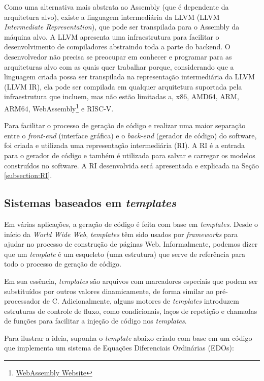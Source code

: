 \documentclass[
	12pt,				%
	openright,			%
	oneside,			%
	a4paper,			%
	main=brazil,
	english,			%
	]{ufsj-abntex2}
\begin{document}
Como uma alternativa mais abstrata ao Assembly (que é dependente da arquitetura alvo), existe a linguagem intermediária da LLVM (LLVM \textit{Intermediate Representation}), que pode ser transpilada para o Assembly da máquina alvo. A LLVM apresenta uma infraestrutura para facilitar o desenvolvimento de compiladores abstraindo toda a parte do backend. O desenvolvedor não precisa se preocupar em conhecer e programar para as arquiteturas alvo com as quais quer trabalhar porque, considerando que a linguagem criada possa ser transpilada na representação intermediária da LLVM (LLVM IR), ela pode ser compilada em qualquer arquitetura suportada pela infraestrutura que incluem, mas não estão limitadas a, x86, AMD64, ARM, ARM64, WebAssembly\footnote{\href{https://webassembly.org/}{WebAssembly Website}} e RISC-V.

Para facilitar o processo de geração de código e realizar uma maior separação entre o \textit{front-end} (interface gráfica) e o \textit{back-end} (gerador de código) do software, foi criada e utilizada uma representação intermediária (RI). A RI é a entrada para o gerador de código e também é utilizada para salvar e carregar os modelos construídos no software. A RI desenvolvida será apresentada e explicada na Seção \ref{subsection:RI}.

\subsection{Sistemas baseados em \textit{templates}}
 
Em várias aplicações, a geração de código é feita com base em \textit{templates}. Desde o início da \textit{World Wide Web}, \textit{templates} têm sido usados por \textit{frameworks} para ajudar no processo de construção de páginas Web. Informalmente, podemos dizer que um \textit{template} é um esqueleto (uma estrutura) que serve de referência para todo o processo de geração de código.

Em sua essência, \textit{templates} são arquivos com marcadores especiais que podem ser substituídos por outros valores dinamicamente, de forma similar ao pré-processador de C. Adicionalmente, alguns motores de \textit{templates} introduzem estruturas de controle de fluxo, como condicionais, laços de repetição e chamadas de funções para facilitar a injeção de código nos \textit{templates}.  

Para ilustrar a ideia, suponha o \textit{template} abaixo criado com base em um código que implementa um sistema de Equações Diferenciais Ordinárias (EDOs):  
\end{document}
